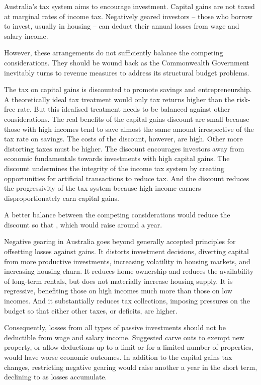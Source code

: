 \documentclass{grattan}\usepackage[]{graphicx}\usepackage[]{color}
\begin{document}
\newlength{\overviewextra}
\setlength{\overviewextra}{4pt}
\addtolength{\columnsep}{\overviewextra}
\begin{overview*}[-35pt]
Australia's tax system aims to encourage investment. Capital gains are not taxed at marginal rates of income tax. Negatively geared investors -- those who borrow to invest, usually in housing -- can deduct their annual losses from wage and salary income. 

However, these arrangements do not sufficiently balance the competing considerations. They should be wound back as the Commonwealth Government inevitably turns to revenue measures to address its structural budget problems. 

The tax on capital gains is discounted to promote savings and entrepreneurship. A theoretically ideal tax treatment would only tax returns higher than the risk-free rate. But this idealised treatment needs to be balanced against other considerations. The real benefits of the capital gains discount are small because those with high incomes tend to save almost the same amount irrespective of the tax rate on savings. The costs of the discount, however, are high. Other more distorting taxes must be higher. The discount encourages investors away from economic fundamentals towards investments with high capital gains. The discount undermines the integrity of the income tax system by creating opportunities for artificial transactions to reduce tax. And the discount reduces the progressivity of the tax system because high-income earners disproportionately earn capital gains.

A better balance between the competing considerations would reduce the discount so that , which would raise around  a year.

Negative gearing in Australia goes beyond generally accepted principles for offsetting losses against gains. It distorts investment decisions, diverting capital from more productive investments, increasing volatility in housing markets, and increasing housing churn. It reduces home ownership and reduces the availability of long-term rentals, but does not materially increase housing supply. It is regressive, benefiting those on high incomes much more than those on low incomes. And it substantially reduces tax collections, imposing pressures on the budget so that either other taxes, or deficits, are higher.

Consequently, losses from all types of passive investments should not be deductible from wage and salary income. Suggested carve outs to exempt new property, or allow deductions up to a limit or for a limited number of properties, would have worse economic outcomes. In addition to the capital gains tax changes, restricting negative gearing would raise another  a year in the short term, declining to  as losses accumulate.


\end{overview*}
\end{document}
